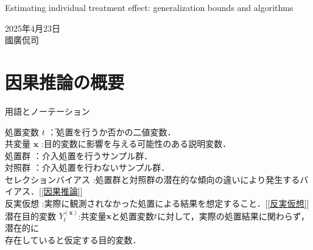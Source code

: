 \documentclass[dvipdfmx]{jreport}
\begin{document}
\begin{center}
    \large{Estimating individual treatment effect: generalization bounds and algorithms}
\end{center}

\begin{flushright}
    2025年4月23日\\
    國廣侃司
\end{flushright}

\section{因果推論の概要}
\begin{itembox}[l]{\large{用語とノーテーション}}
    \begin{tabbing}
        \hspace{15pt} \raisebox{0.5ex}{\tiny $\bullet$} 処置変数 $t$ \hspace{50pt}\=：処置を行うか否かの二値変数．\\[0.5em] 
        \hspace{15pt} \raisebox{0.5ex}{\tiny $\bullet$} 共変量 $\boldsymbol{x}$ \>:目的変数に影響を与える可能性のある説明変数．\\[0.5em] 
        \hspace{15pt} \raisebox{0.5ex}{\tiny $\bullet$} 処置群 \>：介入処置を行うサンプル群．\\[0.5em]
        \hspace{15pt} \raisebox{0.5ex}{\tiny $\bullet$} 対照群 \>：介入処置を行わないサンプル群．\\[0.5em]        
        \hspace{15pt} \raisebox{0.5ex}{\tiny $\bullet$} セレクションバイアス \>:処置群と対照群の潜在的な傾向の違いにより発生するバイアス．[\ref{因果推論}]\\[0.5em] 
        \hspace{15pt} \raisebox{0.5ex}{\tiny $\bullet$} 反実仮想 \>:実際に観測されなかった処置による結果を想定すること．[\ref{反実仮想}]\\[0.5em]
        \hspace{15pt} \raisebox{0.5ex}{\tiny $\bullet$} 潜在目的変数 $Y_t^{(\boldsymbol{x})}$\>:共変量$\boldsymbol{x}$と処置変数$t$に対して，実際の処置結果に関わらず，潜在的に\\[0.5em]\>\hspace{6.5pt}存在していると仮定する目的変数．\\[0.5em] 

\end{tabbing}
\end{itembox}
\end{document}
